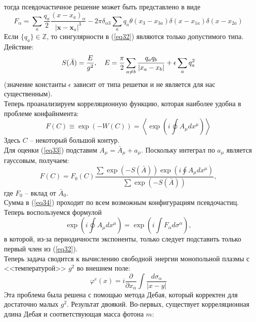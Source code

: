\documentclass[12pt]{article}
\theoremstyle{definition}
\begin{document}
тогда псевдочастичное решение может быть представлено в виде
\begin{equation}\label{eq32}
    F_\alpha=\sum\limits_a\frac{q_a}{2}\frac{(x-x_a)_\alpha}{|\bm{x}-\bm{x}_a|^3}-2\pi\delta_{\alpha3}\sum\limits_{a}q_a\theta(x_3-x_{3a})\delta(x-x_{1a})\delta(x-x_{2a})
\end{equation}
Если $\{q_a\}\in\mathbb{Z}$, то сингулярности в (\ref{eq32}) являются только допустимого типа.\\
Действие:
\begin{equation}
    S(\Bar{A})=\frac{E}{g^2},\quad E=\frac{\pi}{2}\sum\limits_{a\neq b}\frac{q_aq_b}{|x_a-x_b|}+\epsilon\sum\limits_{a}q_a^2
\end{equation}
(значение константы $\epsilon$ зависит от типа решетки и не является для нас существенным).\\
Теперь проанализируем корреляционную функцию, которая наиболее удобна в проблеме конфайнмента:
\begin{equation}\label{eq33}
    F(C)\equiv\exp(-W(C))=\left<\exp\left(i\oint A_\mu dx^\mu\right)\right>
\end{equation}
Здесь $C$ -- некоторый большой контур.\\
Для оценки (\ref{eq33}) подставим $A_\mu=\bar{A}_\mu+a_\mu$. Поскольку интеграл по $a_\mu$ является гауссовым, получаем:
\begin{equation}\label{eq34}
    F(C)=F_0(C)\frac{\sum\exp(-S(\bar{A}))\exp\left(i\oint A_\mu dx^\mu\right)}{\sum\exp(-S(\bar{A}))},
\end{equation}
где $F_0$ -- вклад от $\bar{A}_0$.\\
Сумма в (\ref{eq34}) проходит по всем возможным конфигурациям псевдочастиц. Теперь воспользуемся формулой
\begin{equation}
    \exp\left(i\oint A_\mu dx^\mu\right)=\exp\left(i\int F_\alpha d\sigma^\alpha\right),
\end{equation}
в которой, из-за периодичности экспоненты, только следует подставить только первый член из (\ref{eq32}).\\
Теперь задача сводится к вычислению свободной энергии монопольной плазмы с <<температурой>> $g^2$ во внешнем поле:
\begin{equation}
    \varphi^e(x)=i\frac{\partial}{\partial x_\alpha}\int\frac{d\sigma_\alpha}{|x-y|}
\end{equation}
Эта проблема была решена с помощью метода Дебая, который корректен для достаточно малых $g^2$. Результат двоякий. Во-первых, существует корреляционная длина Дебая и соответствующая масса фотона $m$:
\end{document}
